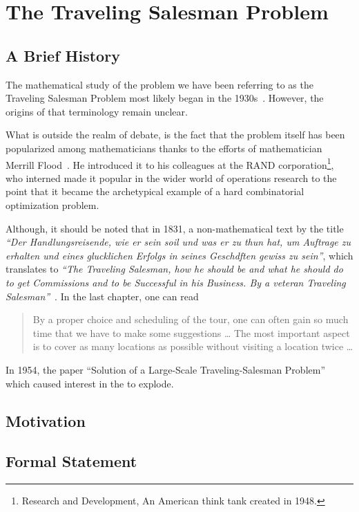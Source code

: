 \chapter{The Traveling Salesman Problem}

    \section{A Brief History}

    The mathematical study of the problem we have been referring to as the Traveling Salesman Problem most likely began in the 1930s~\cite{tsp-computational-solutions}. However, the origins of that terminology remain unclear.

    What is outside the realm of debate, is the fact that the problem itself has been popularized among mathematicians thanks to the efforts of mathematician Merrill Flood~\cite{tsp-computational-study}. He introduced it to his colleagues at the RAND corporation\footnote{Research and Development, An American think tank created in 1948.}, who interned made it popular in the wider world of operations research to the point that it became the archetypical example of a hard combinatorial optimization problem.

    Although, it should be noted that in 1831, a non-mathematical text by the title \emph{``Der Handlungsreisende, wie er sein soil und was er zu thun hat, um Auftrage zu erhalten und eines glucklichen Erfolgs in seines Geschdften gewiss zu sein''}, which translates to \emph{``The Traveling Salesman, how he should be and what he should do to get Commissions and to be Successful in his Business. By a veteran Traveling Salesman''}~\cite{tsp-tour,original}. In the last chapter, one can read 
    \begin{quote}
        By a proper choice and scheduling of the tour, one can often gain so much time that we have to make some suggestions \dots{} The most important aspect is to cover as many locations as possible without visiting a location twice \dots
    \end{quote}

    In 1954, the paper ``Solution of a Large-Scale Traveling-Salesman Problem''~\cite{large-scale} which caused interest in the \TSP to explode.

    \section{Motivation}

    \section{Formal Statement}